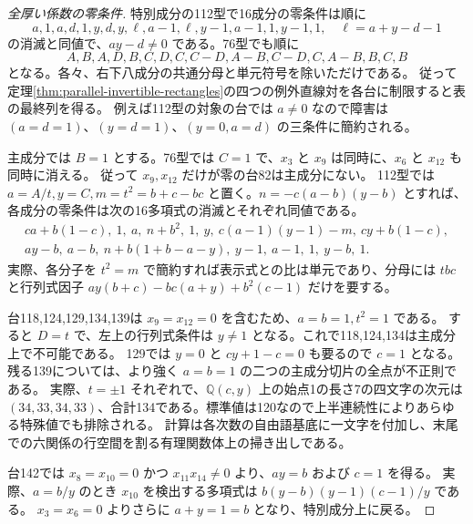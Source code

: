 \begin{proof}[全厚い係数の零条件]
特別成分の112型で16成分の零条件は順に
\[
 a,1,a,d,1,y,d,y,\ell,a-1,\ell,y-1,a-1,1,y-1,1,\quad
 \ell=a+y-d-1
\]
の消滅と同値で、$ay-d\ne0$ である。76型でも順に
\[
 A,B,A,D,B,C,D,C,C-D,A-B,C-D,C,A-B,B,C,B
\]
となる。各々、右下八成分の共通分母と単元符号を除いただけである。
従って定理\ref{thm:parallel-invertible-rectangles}の四つの例外直線対を各台に制限すると表の最終列を得る。
例えば112型の対象の台では $a\ne0$ なので障害は
$(a=d=1)$、$(y=d=1)$、$(y=0,a=d)$ の三条件に簡約される。

主成分では $B=1$ とする。76型では $C=1$ で、$x_3$ と $x_9$ は同時に、$x_6$ と $x_{12}$ も同時に消える。
従って $x_9,x_{12}$ だけが零の台82は主成分にない。
112型では $a=A/t,y=C,m=t^2=b+c-bc$ と置く。$n=-c(a-b)(y-b)$ とすれば、
各成分の零条件は次の16多項式の消滅とそれぞれ同値である。
\[
\begin{gathered}
 ca+b(1-c),\ 1,\ a,\ n+b^2,\ 1,\ y,\ c(a-1)(y-1)-m,\ cy+b(1-c),\\
 ay-b,\ a-b,\ n+b(1+b-a-y),\ y-1,\ a-1,\ 1,\ y-b,\ 1 .
\end{gathered}
\]
実際、各分子を $t^2=m$ で簡約すれば表示式との比は単元であり、分母には
$tbc$ と行列式因子 $ay(b+c)-bc(a+y)+b^2(c-1)$ だけを要する。

台118,124,129,134,139は $x_9=x_{12}=0$ を含むため、$a=b=1,t^2=1$ である。
すると $D=t$ で、左上の行列式条件は $y\ne1$ となる。これで118,124,134は主成分上で不可能である。
129では $y=0$ と $cy+1-c=0$ も要るので $c=1$ となる。
残る139については、より強く $a=b=1$ の二つの主成分切片の全点が不正則である。
実際、$t=\pm1$ それぞれで、$\mathbb Q(c,y)$ 上の始点1の長さ7の四文字の次元は
$(34,33,34,33)$、合計134である。標準値は120なので上半連続性によりあらゆる特殊値でも排除される。
計算は各次数の自由語基底に一文字を付加し、末尾での六関係の行空間を割る有理関数体上の掃き出しである。

台142では $x_8=x_{10}=0$ かつ $x_{11}x_{14}\ne0$ より、$ay=b$ および $c=1$ を得る。
実際、$a=b/y$ のとき $x_{10}$ を検出する多項式は $b(y-b)(y-1)(c-1)/y$ である。
$x_3=x_6=0$ よりさらに $a+y=1=b$ となり、特別成分上に戻る。
\end{proof}


